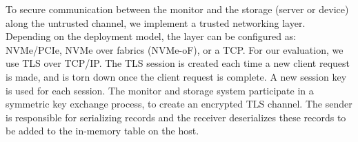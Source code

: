 



To secure communication between the monitor and the storage (server or device) along the untrusted channel, we implement a trusted networking layer. Depending on the deployment model, the layer can be configured as: NVMe/PCIe, NVMe over fabrics (NVMe-oF), or a TCP. 
For our evaluation, we use TLS over TCP/IP. The TLS session is created each time a new client request is made, and is torn down once the client request is complete. A new session key is used for each session. The monitor and storage system participate in a symmetric key exchange process, to create an encrypted TLS channel.
The sender is responsible for serializing records and the receiver deserializes these records to be added to the in-memory table on the host.





